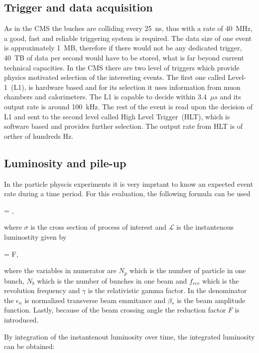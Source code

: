 \subsection{Trigger and data acquisition}

As in the CMS the buches are colliding every 25~ns, thus with a rate of 40~MHz, a good, fast and reliable triggering system is required. The data size of one event is approximately 1~MB, therefore if there would not be any dedicated trigger, 40~TB of data per second would have to be stored, what is far beyond current technical capacities. In the CMS there are two level of triggers which provide physics motivated selection of the interesting events. The first one called Level-1~(L1), is hardware based and for its selection it uses information from muon chambers and calorimeters. The L1 is capable to decide within 3.4~$\mu s$ and its output rate is around 100~kHz. The rest of the event is read upon the decision of L1 and sent to the second level called High Level Trigger~(HLT), which is software based and provides further selection. The output rate from HLT is of orther of hundreds Hz.

\subsection{Luminosity and pile-up}

In the particle physcis experiments it is very imprtant to know an expected event rate during a time period. For this evaluation, the following formula can be used

{
  = \sigma \times {},
}

where $\sigma$ is the cross section of process of interest and $\mathcal{L}$ is the instantenous luminostity given by

{
  = F,
}

where the variables in numerator are $N_{p}$ which is the number of particle in one bunch, $N_{b}$ which is the number of bunches in one beam and $f_{rev}$ which is the revolution frequency and $\gamma$ is the relativistic gamma factor. In the denominator the $\epsilon_{n}$ is normalized transverse beam emmitance and $\beta_{*}$ is the beam amplitude function. Lastly, because of the beam crossing angle the reduction factor $F$ is introduced.

By integration of the instantenout luminosity over time, the integrated luminosity can be obtained:

